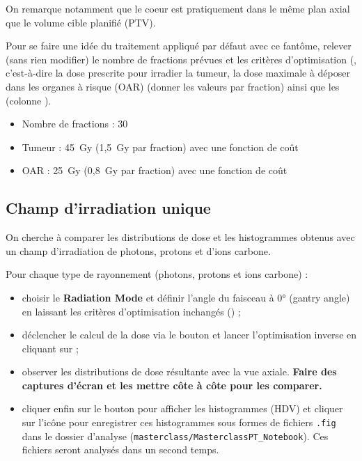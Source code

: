 \documentclass[a4paper,12pt,notitlepage]{article}	%
\begin{document}
\begin{questions}
\begin{reponse}
  On remarque notamment que le coeur est pratiquement dans le même plan axial que le volume cible planifié (PTV).
\end{reponse}


\question Pour se faire une idée du traitement appliqué par défaut avec ce fantôme, relever (sans rien modifier) le nombre de fractions prévues et les critères d'optimisation (, c'est-à-dire la dose prescrite pour irradier la tumeur, la dose maximale à déposer dans les organes à risque (OAR) (donner les valeurs par fraction) ainsi que les  (colonne ).

\begin{reponse}
  \begin{itemize}
		\item Nombre de fractions : 30
    \item Tumeur : 45~Gy (1,5~Gy par fraction) avec une fonction de coût 
    \item OAR : 25~Gy (0,8~Gy par fraction) avec une fonction de coût 
  \end{itemize}

\end{reponse}

\subsection{Champ d'irradiation unique}

On cherche à comparer les distributions de dose et les histogrammes  obtenus avec un champ d'irradiation de photons, protons et d'ions carbone. 

\question \label{1champ} Pour chaque type de rayonnement (photons, protons et ions carbone) :
\begin{itemize}
  \item choisir le \textbf{Radiation Mode} et définir l'angle du faisceau à 0° (gantry angle) en laissant les critères d'optimisation inchangés () ;
  \item déclencher le calcul de la dose via le bouton \textbf{} et lancer l'optimisation inverse en cliquant sur \textbf{};
  \item observer les distributions de dose résultante avec la vue axiale. \textbf{Faire des captures d'écran et les mettre côte à côte pour les comparer.}
  \item cliquer enfin sur le bouton \textbf{} pour afficher les histogrammes  (HDV) et cliquer sur l'icône  pour enregistrer ces histogrammes sous formes de fichiers \texttt{.fig} dans le dossier d'analyse (\texttt{masterclass/MasterclassPT\_Notebook}). Ces fichiers seront analysés dans un second temps.
\end{itemize}


\end{questions}
\end{document}
